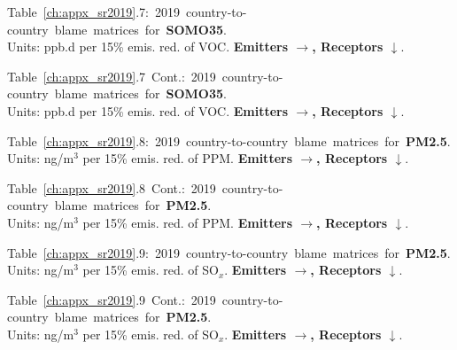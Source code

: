 \footnotesize{\mbox{Table \ref{ch:appx_sr2019}.7: 2019 country-to-country blame matrices for \textbf{SOMO35}.}\\ Units: ppb.d per 15\% emis. red. of VOC. \textbf{Emitters $\rightarrow$, Receptors $\downarrow$}. }\\[\baselineskip]\enlargethispage{\myenlarge} \hspace{-0.5cm} 
\centerline{}\clearpage
\footnotesize{\mbox{Table \ref{ch:appx_sr2019}.7 Cont.: 2019 country-to-country blame matrices for \textbf{SOMO35}.}\\ Units: ppb.d per 15\% emis. red. of VOC. \textbf{Emitters $\rightarrow$, Receptors $\downarrow$}. }\\[\baselineskip]\enlargethispage{\myenlarge} \hspace{-0.5cm} 
\centerline{}\clearpage

\footnotesize{\mbox{Table \ref{ch:appx_sr2019}.8: 2019 country-to-country blame matrices for \textbf{PM2.5}.}\\ Units: ng/m$^3$ per 15\% emis. red. of PPM. \textbf{Emitters $\rightarrow$, Receptors $\downarrow$}. }\\[\baselineskip]\enlargethispage{\myenlarge} \hspace{-0.5cm} 
\centerline{}\clearpage
\footnotesize{\mbox{Table \ref{ch:appx_sr2019}.8 Cont.: 2019 country-to-country blame matrices for \textbf{PM2.5}.}\\ Units: ng/m$^3$ per 15\% emis. red. of PPM. \textbf{Emitters $\rightarrow$, Receptors $\downarrow$}. }\\[\baselineskip]\enlargethispage{\myenlarge} \hspace{-0.5cm} 
\centerline{}\clearpage

\footnotesize{\mbox{Table \ref{ch:appx_sr2019}.9: 2019 country-to-country blame matrices for \textbf{PM2.5}.}\\ Units: ng/m$^3$ per 15\% emis. red. of SO$_x$. \textbf{Emitters $\rightarrow$, Receptors $\downarrow$}. }\\[\baselineskip]\enlargethispage{\myenlarge} \hspace{-0.5cm} 
\centerline{}\clearpage
\footnotesize{\mbox{Table \ref{ch:appx_sr2019}.9 Cont.: 2019 country-to-country blame matrices for \textbf{PM2.5}.}\\ Units: ng/m$^3$ per 15\% emis. red. of SO$_x$. \textbf{Emitters $\rightarrow$, Receptors $\downarrow$}. }\\[\baselineskip]\enlargethispage{\myenlarge} \hspace{-0.5cm} 
\centerline{}\clearpage

